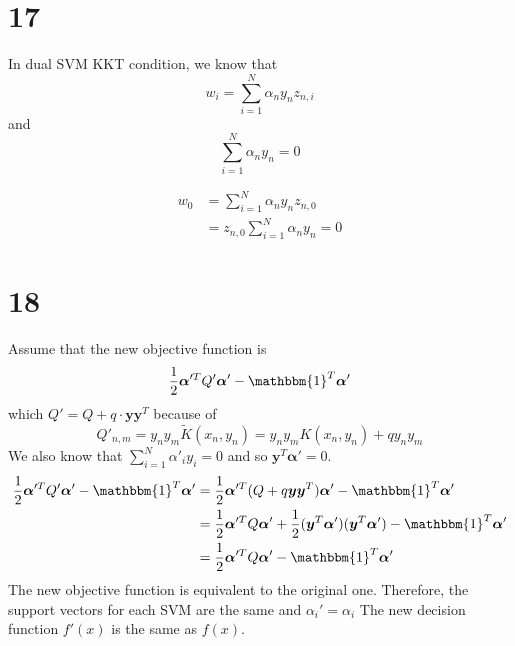 \documentclass[12pt]{article}
\begin{document}
\section*{17}
In dual SVM KKT condition, we know that
\begin{equation}
    w_i = \sum_{i=1}^{N} \alpha_n y_n z_{n,i}
\end{equation}
and 
\begin{equation}
    \sum_{i=1}^{N} \alpha_n y_n = 0
\end{equation}

\begin{equation*}
\begin{split}
    w_0 &= \sum_{i=1}^{N} \alpha_n y_n z_{n,0} \\
    &=  z_{n,0} \sum_{i=1}^{N} \alpha_n y_n = 0
\end{split}
\end{equation*}


\section*{18}
Assume that the new objective function is 
\[  \frac{1}{2} \bm{\alpha}'^T Q' \bm{\alpha}' - \mathbbm{1}^T \bm{\alpha}' \]
which $Q' = Q + q \cdot \bm{y} \bm{y}^T$ because of 
\[ 
    Q'_{n,m} 
    = y_n y_m \tilde{K}(x_n, y_n)
    = y_n y_m K(x_n, y_n) + q y_n y_m
\]
We also know that $\sum_{i=1}^{N} \alpha'_i y_i = 0$ and so $\bm{y}^T\bm{\alpha}' = 0$.
\begin{equation*}
    \begin{split}
        \frac{1}{2} \bm{\alpha}'^T Q' \bm{\alpha}' - \mathbbm{1}^T \bm{\alpha}'
        &= \frac{1}{2} \bm{\alpha}'^T (Q + q\bm{y} \bm{y}^T) \bm{\alpha}' - \mathbbm{1}^T \bm{\alpha}' \\
        &= \frac{1}{2} \bm{\alpha}'^T Q \bm{\alpha}' + \frac{1}{2} (\bm{y}^T\bm{\alpha}')(\bm{y}^T\bm{\alpha}')  - \mathbbm{1}^T \bm{\alpha}' \\
        &=  \frac{1}{2} \bm{\alpha}'^T Q \bm{\alpha}' - \mathbbm{1}^T \bm{\alpha}'
    \end{split}
\end{equation*}
The new objective function is equivalent to the original one. Therefore, the support vectors for each SVM are the same and $\alpha_i' = \alpha_i$
The new decision function $f'(x)$ is the same as $f(x)$.
\end{document}
